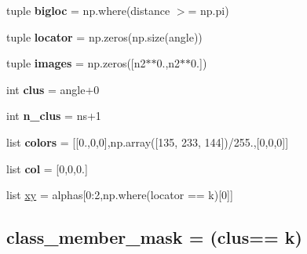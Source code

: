 \begin{DoxyCompactItemize}
\item 
\hypertarget{namespace_mu_s_c_a_de_t_1_1pca__ring__spectrum_aba475a67a2d9adf262eb02db7d0d783a}{}tuple {\bfseries bigloc} = np.\+where(distance $>$= np.\+pi)\label{namespace_mu_s_c_a_de_t_1_1pca__ring__spectrum_aba475a67a2d9adf262eb02db7d0d783a}

\item 
\hypertarget{namespace_mu_s_c_a_de_t_1_1pca__ring__spectrum_a343d6afc0b96d93d9289e3079abf0a0b}{}tuple {\bfseries locator} = np.\+zeros(np.\+size(angle))\label{namespace_mu_s_c_a_de_t_1_1pca__ring__spectrum_a343d6afc0b96d93d9289e3079abf0a0b}

\item 
\hypertarget{namespace_mu_s_c_a_de_t_1_1pca__ring__spectrum_ac52293bbcc32e9df623164573cc5de07}{}tuple {\bfseries images} = np.\+zeros(\mbox{[}n2$\ast$$\ast$0.,n2$\ast$$\ast$0.\mbox{]})\label{namespace_mu_s_c_a_de_t_1_1pca__ring__spectrum_ac52293bbcc32e9df623164573cc5de07}

\item 
\hypertarget{namespace_mu_s_c_a_de_t_1_1pca__ring__spectrum_a449f5d113d79cc66484a41fa82ca9099}{}int {\bfseries clus} = angle+0\label{namespace_mu_s_c_a_de_t_1_1pca__ring__spectrum_a449f5d113d79cc66484a41fa82ca9099}

\item 
\hypertarget{namespace_mu_s_c_a_de_t_1_1pca__ring__spectrum_aa3058270d343b4d637810456e7801fb2}{}int {\bfseries n\+\_\+clus} = ns+1\label{namespace_mu_s_c_a_de_t_1_1pca__ring__spectrum_aa3058270d343b4d637810456e7801fb2}

\item 
\hypertarget{namespace_mu_s_c_a_de_t_1_1pca__ring__spectrum_a9383e3a79013beb91de54af29a23a3d1}{}list {\bfseries colors} = \mbox{[}\mbox{[}0.,0,0\mbox{]},np.\+array(\mbox{[}135, 233, 144\mbox{]})/255.,\mbox{[}0,0,0\mbox{]}\mbox{]}\label{namespace_mu_s_c_a_de_t_1_1pca__ring__spectrum_a9383e3a79013beb91de54af29a23a3d1}

\item 
\hypertarget{namespace_mu_s_c_a_de_t_1_1pca__ring__spectrum_aa16272d0f76802cc9215ee7557b76d33}{}list {\bfseries col} = \mbox{[}0,0,0.\mbox{]}\label{namespace_mu_s_c_a_de_t_1_1pca__ring__spectrum_aa16272d0f76802cc9215ee7557b76d33}

\item 
\hypertarget{namespace_mu_s_c_a_de_t_1_1pca__ring__spectrum_ab62c2c1eb8191f2fca9faf5f26b25d97}{}list \hyperlink{namespace_mu_s_c_a_de_t_1_1pca__ring__spectrum_ab62c2c1eb8191f2fca9faf5f26b25d97}{xy} = alphas\mbox{[}0\+:2,np.\+where(locator == k)\mbox{[}0\mbox{]}\mbox{]}\label{namespace_mu_s_c_a_de_t_1_1pca__ring__spectrum_ab62c2c1eb8191f2fca9faf5f26b25d97}

\begin{DoxyCompactList}\small\item\em \subsection*{class\+\_\+member\+\_\+mask = (clus== k)}\end{DoxyCompactList}\end{DoxyCompactItemize}


